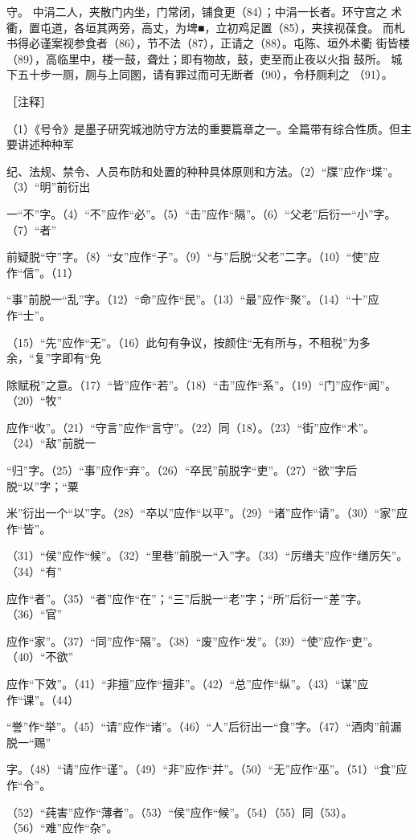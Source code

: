 \documentclass[12pt,UTF8]{ctexbook}
\begin{document}
守。 
中涓二人，夹散门内坐，门常闭，铺食更（84）；中涓一长者。环守宫之 
术衢，置屯道，各垣其两旁，高丈，为埤■，立初鸡足置（85），夹挟视葆食。 
而札书得必谨案视参食者（86），节不法（87），正请之（88）。屯陈、垣外术衢 
街皆楼（89），高临里中，楼一鼓，聋灶；即有物故，鼓，吏至而止夜以火指 
鼓所。 
城下五十步一厕，厕与上同圂，请有罪过而可无断者（90），令杼厕利之 
（91）。 


［注释］ 

（1）《号令》是墨子研究城池防守方法的重要篇章之一。全篇带有综合性质。但主要讲述种种军 

纪、法规、禁令、人员布防和处置的种种具体原则和方法。（2）“牒”应作“堞”。（3）“明”前衍出 

一“不”字。（4）“不”应作“必”。（5）“击”应作“隔”。（6）“父老”后衍一“小”字。（7）“者” 

前疑脱“守”字。（8）“女”应作“子”。（9）“与”后脱“父老”二字。（10）“使”应作“信”。（11） 

“事”前脱一“乱”字。（12）“命”应作“民”。（13）“最”应作“聚”。（14）“十”应作“士”。 

（15）“先”应作“无”。（16）此句有争议，按颜住“无有所与，不租税”为多余，“复”字即有“免 

除赋税”之意。（17）“皆”应作“若”。（18）“击”应作“系”。（19）“门”应作“闻”。（20）“牧” 

应作“收”。（21）“守言”应作“言守”。（22）同（18）。（23）“街”应作“术”。（24）“敌”前脱一 

“归”字。（25）“事”应作“弃”。（26）“卒民”前脱字“吏”。（27）“欲”字后脱“以”字；“粟 

米”衍出一个“以”字。（28）“卒以”应作“以平”。（29）“诸”应作“请”。（30）“家”应作“皆”。 

（31）“侯”应作“候”。（32）“里巷”前脱一“入”字。（33）“厉缮夫”应作“缮厉矢”。（34）“有” 

应作“者”。（35）“者”应作“在”；“三”后脱一“老”字；“所”后衍一“差”字。（36）“官” 

应作“家”。（37）“同”应作“隔”。（38）“废”应作“发”。（39）“使”应作“吏”。（40）“不欲” 

应作“下效”。（41）“非擅”应作“擅非”。（42）“总”应作“纵”。（43）“谋”应作“课”。（44） 

“誉”作“举”。（45）“请”应作“诸”。（46）“人”后衍出一“食”字。（47）“酒肉”前漏脱一“赐” 

字。（48）“请”应作“谨”。（49）“非”应作“并”。（50）“无”应作“巫”。（51）“食”应作“令”。 

（52）“莼害”应作“薄者”。（53）“侯”应作“候”。（54）（55）同（53）。（56）“难”应作“杂”。 
\end{document}
